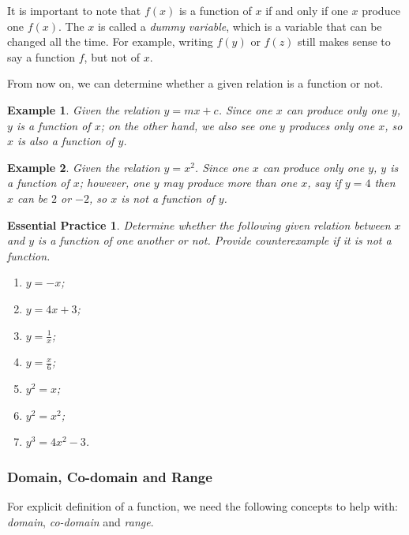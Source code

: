 \documentclass[12pt]{article}
\newtheorem*{example}{Example}
\newtheorem{exercise}{Essential Practice}[subsection]
\begin{document}
    It is important to note that $f(x)$ is a function of $x$ if and only if one $x$ produce one $f(x)$. The $x$ is called a \textit{dummy variable}, which is a variable that can be changed all the time. For example, writing $f(y)$ or $f(z)$ still makes sense to say a function $f$, but not of $x$.

    From now on, we can determine whether a given relation is a function or not.

    \begin{example}
        Given the relation $y=mx+c$. Since one $x$ can produce only one $y$, $y$ is a function of $x$; on the other hand, we also see one $y$ produces only one $x$, so $x$ is also a function of $y$.
    \end{example}

    \begin{example}
        Given the relation $y=x^2$. Since one $x$ can produce only one $y$, $y$ is a function of $x$; however,  one $y$ may produce more than one $x$, say if $y=4$ then $x$ can be $2$ or $-2$, so $x$ is not a function of $y$.
    \end{example}

    \begin{exercise}
        Determine whether the following given relation between $x$ and $y$ is a function of one another or not. Provide counterexample if it is not a function.\begin{enumerate}
            \item $y=-x$;
            \item $y=4x+3$;
            \item $y=\frac{1}{x}$;
            \item $y=\frac{x}{6}$;
            \item $y^2=x$;
            \item $y^2=x^2$;
            \item $y^3=4x^2-3$.
        \end{enumerate}
    \end{exercise}
    \subsubsection*{Domain, Co-domain and Range}

    For explicit definition of a function, we need the following concepts to help with: \textit{domain}, \textit{co-domain} and \textit{range}.
\end{document}
